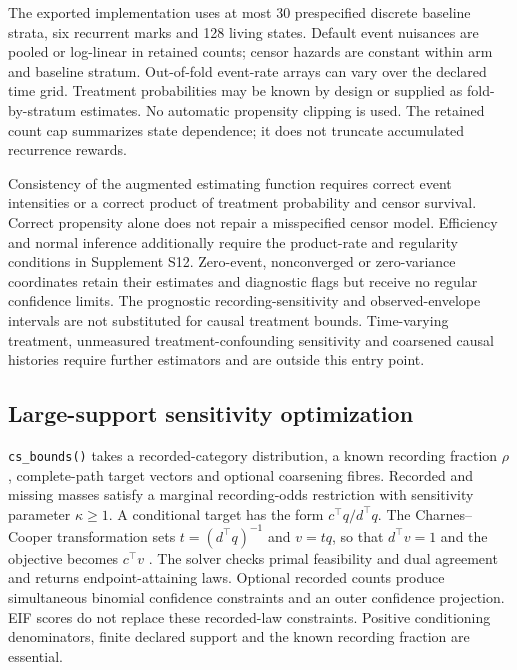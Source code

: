 \documentclass[article,nojss]{jss}
\newcommand{\code}[1]{\texttt{#1}}
\begin{document}
The exported implementation uses at most 30 prespecified discrete baseline strata, six recurrent marks and 128 living states. Default event nuisances are pooled or log-linear in retained counts; censor hazards are constant within arm and baseline stratum. Out-of-fold event-rate arrays can vary over the declared time grid. Treatment probabilities may be known by design or supplied as fold-by-stratum estimates. No automatic propensity clipping is used. The retained count cap summarizes state dependence; it does not truncate accumulated recurrence rewards.

Consistency of the augmented estimating function requires correct event intensities or a correct product of treatment probability and censor survival. Correct propensity alone does not repair a misspecified censor model. Efficiency and normal inference additionally require the product-rate and regularity conditions in Supplement S12. Zero-event, nonconverged or zero-variance coordinates retain their estimates and diagnostic flags but receive no regular confidence limits. The prognostic recording-sensitivity and observed-envelope intervals are not substituted for causal treatment bounds. Time-varying treatment, unmeasured treatment-confounding sensitivity and coarsened causal histories require further estimators and are outside this entry point.

\subsection{Large-support sensitivity optimization}
\code{cs\_bounds()} takes a recorded-category distribution, a known recording fraction $\rho$, complete-path target vectors and optional coarsening fibres. Recorded and missing masses satisfy a marginal recording-odds restriction with sensitivity parameter $\kappa\geq1$. A conditional target has the form $c^\top q/d^\top q$. The Charnes--Cooper transformation sets $t=(d^\top q)^{-1}$ and $v=tq$, so that $d^\top v=1$ and the objective becomes $c^\top v$ \citep{Charnes1962}. The solver checks primal feasibility and dual agreement and returns endpoint-attaining laws. Optional recorded counts produce simultaneous binomial confidence constraints and an outer confidence projection. EIF scores do not replace these recorded-law constraints. Positive conditioning denominators, finite declared support and the known recording fraction are essential.
\end{document}
